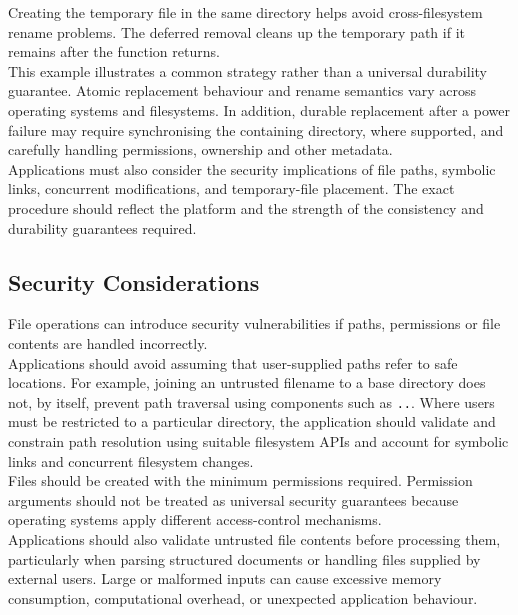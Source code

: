 Creating the temporary file in the same directory helps avoid cross-filesystem rename problems. The deferred removal cleans up the temporary path if it remains after the function returns.\\

This example illustrates a common strategy rather than a universal durability guarantee. Atomic replacement behaviour and rename semantics vary across operating systems and filesystems. In addition, durable replacement after a power failure may require synchronising the containing directory, where supported, and carefully handling permissions, ownership and other metadata.\\

Applications must also consider the security implications of file paths, symbolic links, concurrent modifications, and temporary-file placement. The exact procedure should reflect the platform and the strength of the consistency and durability guarantees required.\\

\subsection{Security Considerations}

File operations can introduce security vulnerabilities if paths, permissions or file contents are handled incorrectly.\\

Applications should avoid assuming that user-supplied paths refer to safe locations. For example, joining an untrusted filename to a base directory does not, by itself, prevent path traversal using components such as \texttt{..}. Where users must be restricted to a particular directory, the application should validate and constrain path resolution using suitable filesystem APIs and account for symbolic links and concurrent filesystem changes.\\

Files should be created with the minimum permissions required. Permission arguments should not be treated as universal security guarantees because operating systems apply different access-control mechanisms.\\

Applications should also validate untrusted file contents before processing them, particularly when parsing structured documents or handling files supplied by external users. Large or malformed inputs can cause excessive memory consumption, computational overhead, or unexpected application behaviour.\\

